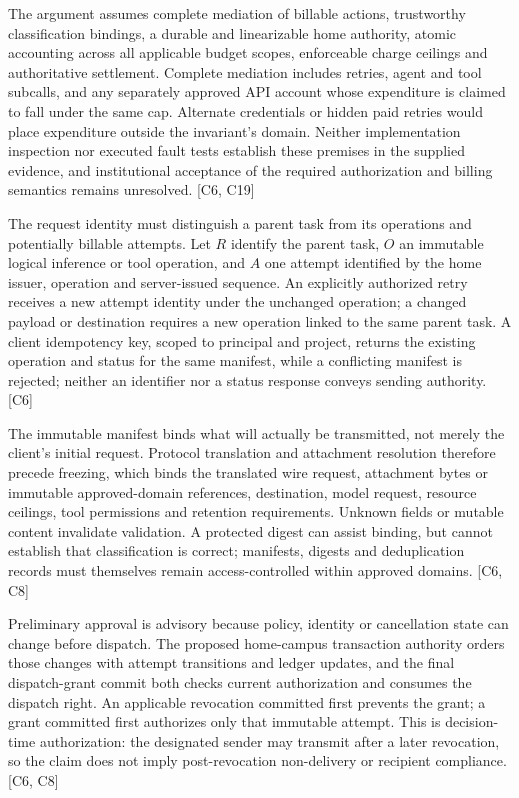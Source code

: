\documentclass[11pt]{article}
\begin{document}
The argument assumes complete mediation of billable actions, trustworthy classification bindings, a durable and linearizable home authority, atomic accounting across all applicable budget scopes, enforceable charge ceilings and authoritative settlement. Complete mediation includes retries, agent and tool subcalls, and any separately approved API account whose expenditure is claimed to fall under the same cap. Alternate credentials or hidden paid retries would place expenditure outside the invariant's domain. Neither implementation inspection nor executed fault tests establish these premises in the supplied evidence, and institutional acceptance of the required authorization and billing semantics remains unresolved. [C6, C19]

The request identity must distinguish a parent task from its operations and potentially billable attempts. Let $R$ identify the parent task, $O$ an immutable logical inference or tool operation, and $A$ one attempt identified by the home issuer, operation and server-issued sequence. An explicitly authorized retry receives a new attempt identity under the unchanged operation; a changed payload or destination requires a new operation linked to the same parent task. A client idempotency key, scoped to principal and project, returns the existing operation and status for the same manifest, while a conflicting manifest is rejected; neither an identifier nor a status response conveys sending authority. [C6]

The immutable manifest binds what will actually be transmitted, not merely the client's initial request. Protocol translation and attachment resolution therefore precede freezing, which binds the translated wire request, attachment bytes or immutable approved-domain references, destination, model request, resource ceilings, tool permissions and retention requirements. Unknown fields or mutable content invalidate validation. A protected digest can assist binding, but cannot establish that classification is correct; manifests, digests and deduplication records must themselves remain access-controlled within approved domains. [C6, C8]

Preliminary approval is advisory because policy, identity or cancellation state can change before dispatch. The proposed home-campus transaction authority orders those changes with attempt transitions and ledger updates, and the final dispatch-grant commit both checks current authorization and consumes the dispatch right. An applicable revocation committed first prevents the grant; a grant committed first authorizes only that immutable attempt. This is decision-time authorization: the designated sender may transmit after a later revocation, so the claim does not imply post-revocation non-delivery or recipient compliance. [C6, C8]
\end{document}
